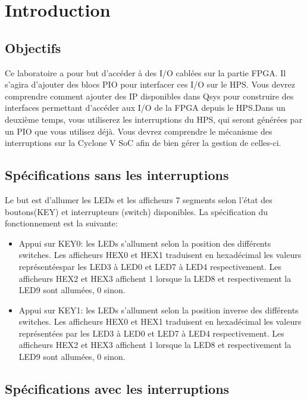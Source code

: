 \section{Introduction}

\subsection{Objectifs}
Ce laboratoire a pour but d’accéder à des I/O cablées sur la partie FPGA. Il s’agira d’ajouter des blocs PIO pour interfacer ces I/O sur le HPS. Vous devrez comprendre comment   ajouter   des   IP   disponibles   dans   Qsys   pour   construire   des   interfaces permettant d’accéder aux I/O de la FPGA depuis le HPS.Dans un deuxième temps, vous utiliserez les interruptions du HPS, qui seront générées par un  PIO  que   vous utilisez  déjà.  Vous devrez  comprendre  le  mécanisme  des interruptions sur la Cyclone V SoC afin de bien gérer la gestion de celles-ci.

\subsection{Spécifications sans les interruptions}
Le but est d’allumer les LEDs et les afficheurs 7 segments selon l’état des boutons(KEY) et interrupteurs (switch) disponibles. La spécification du fonctionnement est la suivante:\\ 
\begin{itemize}
	\item Appui sur KEY0: les LEDs s’allument selon la position des différents switches. Les afficheurs HEX0 et HEX1 traduisent en hexadécimal les valeurs représentéespar les LED3 à LED0 et LED7 à LED4 respectivement. Les afficheurs HEX2 et HEX3 affichent 1 lorsque la LED8 et respectivement la LED9 sont allumées, 0 sinon.\\
	\item Appui sur KEY1: les LEDs s’allument selon la position inverse des différents switches. Les afficheurs HEX0 et HEX1 traduisent en hexadécimal les valeurs représentées   par   les   LED3   à   LED0   et   LED7   à   LED4   respectivement.   Les afficheurs HEX2 et HEX3 affichent 1 lorsque la LED8 et respectivement la LED9 sont allumées, 0 sinon.
\end{itemize}


\subsection{Spécifications avec les interruptions}

